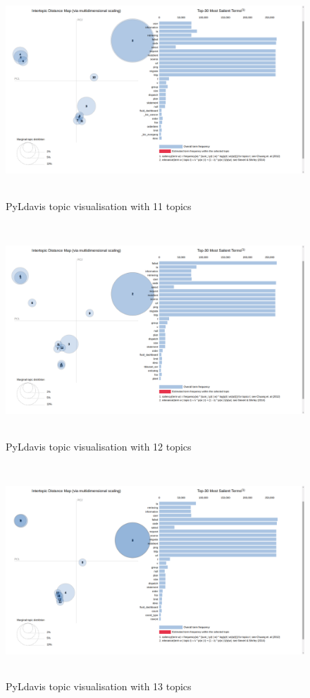  \begin{figure}[!h]
    \centering
    \includegraphics[width=15cm, height=8cm,trim=0 0 100px 0, clip=true]{figures/pyldavis/pyldavis_11.png}
    \caption{PyLdavis topic visualisation with 11 topics}
    \label{fig:pyldavis_11}
\end{figure}

 \begin{figure}[!h]
    \centering
    \includegraphics[width=15cm, height=8cm,trim=0 0 100px 0, clip=true]{figures/pyldavis/pyldavis_12.png}
    \caption{PyLdavis topic visualisation with 12 topics}
    \label{fig:pyldavis_12}
\end{figure}

 \begin{figure}[!h]
    \centering
    \includegraphics[width=15cm, height=8cm,trim=0 0 100px 0, clip=true]{figures/pyldavis/pyldavis_13.png}
    \caption{PyLdavis topic visualisation with 13 topics}
    \label{fig:pyldavis_13}
\end{figure}

